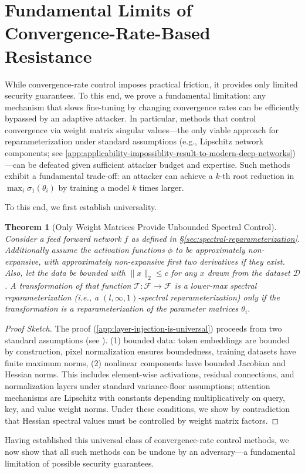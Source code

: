 \documentclass{article}
\theoremstyle{plain}
\newtheorem{theorem}{Theorem}
\theoremstyle{definition}
\theoremstyle{remark}
\begin{document}
\section{Fundamental Limits of Convergence-Rate-Based Resistance}
\label{sec:security-analysis-of-convergence-rate-control} 
While convergence-rate control imposes practical friction, it provides only limited security guarantees. To this end, we prove a fundamental limitation: any mechanism that slows fine-tuning by changing convergence rates can be efficiently bypassed by an adaptive attacker. In particular, methods that control convergence via weight matrix singular values---the only viable approach for reparameterization under standard assumptions (e.g., Lipschitz network components; see \cref{app:applicability-impossiblity-result-to-modern-deep-networks})---can be defeated given sufficient attacker budget and expertise.  Such methods exhibit a fundamental trade-off: an attacker can achieve a $k$-th root reduction in $\max_i{\sigma_1(\theta_i)}$ by training a model $k$ times larger.

To this end, we first establish universality.

\begin{theorem}[Only Weight Matrices Provide Unbounded Spectral Control]
\label{thm:only-weight-matrices-main}
Consider a feed forward network $f$ as defined in \S\ref{sec:spectral-reparameterization}. Additionally assume the activation functions $\phi$ to be approximately non-expansive, with approximately non-expansive first two derivatives if they exist. Also, let the data be bounded with $\|x\|_2 \leq c$ for any $x$ drawn from the dataset $\mathcal{D}$. A transformation of that function $\mathcal{T}: \mathcal{F} \to \mathcal{F}$ is a lower-max spectral reparameterization (i.e., a $(l, \infty, 1)$-spectral reparameterization) only if the transformation is a reparameterization of the parameter matrices $\theta_i$.
\end{theorem}
\begin{proof}[Proof Sketch]
The proof (\cref{app:layer-injection-is-universal}) proceeds from two standard assumptions (see \citealp{du2019gradient, xiong2020layer}). (1) bounded data: token embeddings are bounded by construction, pixel normalization ensures boundedness, training datasets have finite maximum norms, (2) nonlinear components have bounded Jacobian and Hessian norms. This includes element-wise activations, residual connections, and normalization layers under standard variance-floor assumptions; attention mechanisms are Lipschitz with constants depending multiplicatively on query, key, and value weight norms. Under these conditions, we show by contradiction that Hessian spectral values must be controlled by weight matrix factors.
\end{proof}
Having established this universal class of convergence-rate control methods, we now show that all such methods can be undone by an adversary---a fundamental limitation of possible security guarantees.
\end{document}
